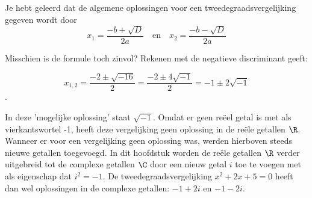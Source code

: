 \documentclass{ximera}
\begin{document}
\begin{image}     
\end{image}
    
    
    





Je hebt geleerd dat de algemene oplossingen voor een tweedegraadsvergelijking gegeven wordt door 
\[  
    x_{1} = \frac{-b + \sqrt{D}}{2a} \quad \text{en} \quad
    x_{2} = \frac{-b - \sqrt{D}}{2a}
\]

Misschien is de formule toch zinvol? Rekenen met de negatieve discriminant geeft:

\[ x_{1,2} = \frac{-2 \pm \sqrt{-16}}{2} = \frac{-2 \pm 4\sqrt{-1}}{2} = -1 \pm 2\sqrt{-1}\]. 

In deze 'mogelijke oplossing' staat \(\sqrt{-1}\). Omdat er geen reëel getal is met als vierkantswortel -1, heeft deze vergelijking geen oplossing in de reële getallen \(\R\). Wanneer er voor een vergelijking geen oplossing was, werden hierboven steeds nieuwe getallen toegevoegd. In dit hoofdstuk worden de reële getallen \(\R\) verder uitgebreid tot de complexe getallen \(\C\) door een nieuw getal \(i\) toe te voegen met als eigenschap dat \(i^2 = -1\). De tweedegraadsvergelijking \(x^2 + 2x + 5 = 0\) heeft dan wel oplossingen in de complexe getallen: \(-1 + 2i\)  en  \(-1-2i\).

\end{document}
